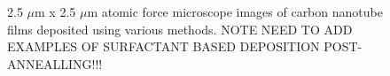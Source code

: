 \documentclass[
  a4paper,
]{scrbook}
\begin{document}
\begin{figure}
\begin{minipage}[t]{0.47\linewidth}
{{}

}

\end{minipage}%
\newline
\begin{minipage}[t]{0.26\linewidth}

{\centering 

~

}

\end{minipage}%
%
\begin{minipage}[t]{0.47\linewidth}

{\centering 


}

\end{minipage}%
%
\begin{minipage}[t]{0.26\linewidth}

{\centering 

~

}

\end{minipage}%

\caption{\label{fig-afm-morphology}2.5 \(\mu\)m x 2.5 \(\mu\)m atomic
force microscope images of carbon nanotube films deposited using various
methods. NOTE NEED TO ADD EXAMPLES OF SURFACTANT BASED DEPOSITION
POST-ANNEALLING!!!}

\end{figure}
\end{document}
